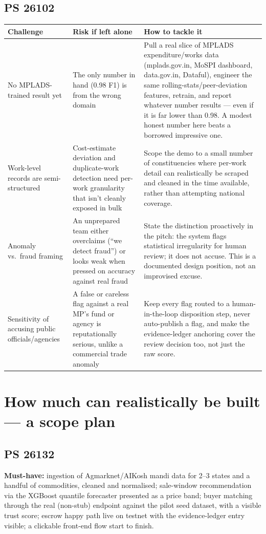 \documentclass[11pt]{article}
\begin{document}
\subsection*{PS 26102}
\renewcommand{\arraystretch}{1.35}
\begin{longtable}{@{}p{3.7cm}p{4.1cm}p{7.0cm}@{}}
\toprule
\textbf{Challenge} & \textbf{Risk if left alone} & \textbf{How to tackle it} \\
\midrule
\endhead
No MPLADS-trained result yet & The only number in hand (0.98 F1) is from the wrong domain & Pull a real
slice of MPLADS expenditure/works data (mplads.gov.in, MoSPI dashboard, data.gov.in, Dataful), engineer the
same rolling-stats/peer-deviation features, retrain, and report whatever number results --- even if it is
far lower than 0.98. A modest honest number here beats a borrowed impressive one. \\[0.4em]
Work-level records are semi-structured & Cost-estimate deviation and duplicate-work detection need
per-work granularity that isn't cleanly exposed in bulk & Scope the demo to a small number of constituencies
where per-work detail can realistically be scraped and cleaned in the time available, rather than
attempting national coverage. \\[0.4em]
Anomaly vs.\ fraud framing & An unprepared team either overclaims (``we detect fraud'') or looks weak when
pressed on accuracy against real fraud & State the distinction proactively in the pitch: the system flags
statistical irregularity for human review; it does not accuse. This is a documented design position, not an
improvised excuse. \\[0.4em]
Sensitivity of accusing public officials/agencies & A false or careless flag against a real MP's fund or
agency is reputationally serious, unlike a commercial trade anomaly & Keep every flag routed to a
human-in-the-loop disposition step, never auto-publish a flag, and make the evidence-ledger anchoring cover
the review decision too, not just the raw score. \\
\bottomrule
\end{longtable}

\clearpage
\section{How much can realistically be built --- a scope plan}

\subsection*{PS 26132}
\textbf{Must-have:} ingestion of Agmarknet/AIKosh mandi data for 2--3 states and a handful of commodities,
cleaned and normalised; sale-window recommendation via the XGBoost quantile forecaster presented as a price
band; buyer matching through the real (non-stub) endpoint against the pilot seed dataset, with a visible
trust score; escrow happy path live on testnet with the evidence-ledger entry visible; a clickable front-end
flow start to finish.
\end{document}
